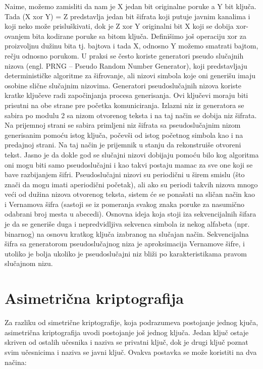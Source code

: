 \documentclass[a4paper]{article}
\begin{document}
Naime, možemo zamisliti da nam je X jedan bit originalne poruke a Y bit ključa. Tada (X xor Y) = Z predstavlja jedan bit šifrata koji putuje javnim kanalima i koji neko može prisluškivati, dok je Z xor Y originalni bit X koji se dobija xor-ovanjem bita kodirane poruke sa bitom ključa. Definišimo još operaciju xor za proizvoljnu dužinu bita tj. bajtova i tada X, odnosno Y možemo smatrati bajtom, rečju odnosno porukom. U praksi se često koriste generatori pseudo slučajnih nizova (engl. PRNG – Pseudo Random Number Generator), koji predstavljaju determinističke algoritme za šifrovanje, ali nizovi simbola koje oni generišu imaju osobine slične slučajnim nizovima. Generatori pseudoslučajnih nizova koriste kratke ključeve radi započinjanja procesa generisanja. Ovi ključevi moraju biti prisutni na obe strane pre početka komuniciranja. Izlazni niz iz generatora se sabira po modulu 2 sa nizom otvorenog teksta i na taj način se dobija niz šifrata. Na prijemnoj strani se sabira primljeni niz šifrata sa pseudoslučajnim nizom generisanim pomoću istog ključa, počevši od istog početnog simbola kao i na predajnoj strani. Na taj način je prijemnik u stanju da rekonstruiše otvoreni tekst. Jasno je da dokle god se slučajni nizovi dobijaju pomoću bilo kog algoritma oni mogu biti samo pseudoslučajni i kao takvi postaju mamac za sve one koji se bave razbijanjem šifri. Pseudoslučajni nizovi su periodični u širem smislu (što znači da mogu imati aperiodični početak), ali ako su periodi takvih nizova mnogo veći od dužina nizova otvorenog teksta, sistem će se ponašati na sličan način kao i Vernamova šifra (sastoji se iz pomeranja svakog znaka poruke za nasumično odabrani broj mesta u abecedi). Osnovna ideja koja stoji iza sekvencijalnih šifara je da se generiše duga i nepredvidljiva sekvenca simbola iz nekog alfabeta (npr. binarnog) na osnovu kratkog ključa izabranog na slučajan način. Sekvencijalna šifra sa generatorom pseudoslučajnog niza je aproksimacija Vernamove šifre, i utoliko je bolja ukoliko je pseudoslučajni niz bliži po karakteristikama pravom slučajnom nizu.

\section{Asimetrična kriptografija}
\label{sec:asimetricčna_kriptografija}
Za razliku od simetrične kriptografije, koja podrazumeva postojanje jednog kjuča, asimetrična kriptografija uvodi postojanje još jednog ključa. Jedan ključ ostaje skriven od
ostalih učesnika i naziva se privatni ključ, dok je drugi ključ poznat svim učesnicima i naziva se javni ključ. Ovakva postavka se može koristiti na dva načina:
\end{document}

